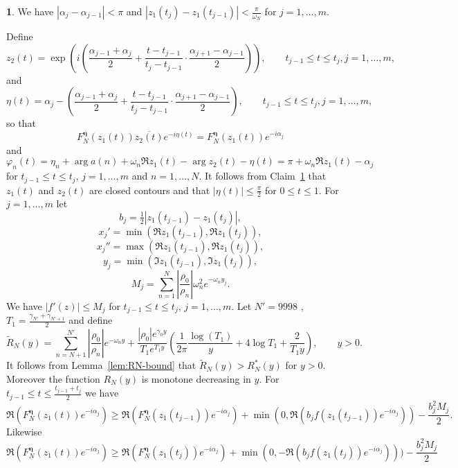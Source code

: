 \documentclass[oneside,english]{amsart}
\numberwithin{equation}{section}
\numberwithin{figure}{section}
\theoremstyle{plain}
\theoremstyle{plain}
\theoremstyle{plain}
\theoremstyle{definition}
\newtheorem{claim}{\protect\claimname}
\providecommand{\claimname}{Claim}
\begin{document}
\begin{claim}
\label{claim:arguments}We have $\left|\alpha_{j}-\alpha_{j-1}\right|<\pi$
and $\left|z_{1}(t_{j})-z_{1}(t_{j-1})\right|<\frac{\pi}{\omega_{N}}$
for $j=1,\dotsc,m$.
\end{claim}
Define 
\[
z_{2}(t)=\exp\left(i\left(\frac{\alpha_{j-1}+\alpha_{j}}{2}+\frac{t-t_{j-1}}{t_{j}-t_{j-1}}\cdot\frac{\alpha_{j+1}-\alpha_{j-1}}{2}\right)\right),\qquad t_{j-1}\leq t\leq t_{j},j=1,\dotsc,m,
\]
and
\[
\eta(t)=\alpha_{j}-\left(\frac{\alpha_{j-1}+\alpha_{j}}{2}+\frac{t-t_{j-1}}{t_{j}-t_{j-1}}\cdot\frac{\alpha_{j+1}-\alpha_{j-1}}{2}\right),\qquad t_{j-1}\leq t\leq t_{j},j=1,\dotsc,m,
\]
so that
\[
F_{N}^{\boldsymbol{\eta}}(z_{1}(t))\overline{z_{2}(t)}e^{-i\eta(t)}=F_{N}^{\boldsymbol{\eta}}(z_{1}(t))e^{-i\alpha_{j}}
\]
and
\[
\varphi_{n}(t)=\eta_{n}+\arg a(n)+\omega_{n}\Re z_{1}(t)-\arg z_{2}(t)-\eta(t)=\pi+\omega_{n}\Re z_{1}(t)-\alpha_{j}
\]
for $t_{j-1}\leq t\leq t_{j}$, $j=1,\dotsc,m$ and $n=1,\dotsc,N$.
It follows from Claim~\ref{claim:arguments} that $z_{1}(t)$ and
$z_{2}(t)$ are closed contours and that $\left|\eta(t)\right|\leq\frac{\pi}{2}$
for $0\leq t\leq1$. For $j=1,\dotsc,m$ let 
\[
b_{j}=\tfrac{1}{2}\left|z_{1}(t_{j-1})-z_{1}(t_{j})\right|,
\]
\[
x_{j}'=\min(\Re z_{1}(t_{j-1}),\Re z_{1}(t_{j})),
\]
\[
x_{j}''=\max(\Re z_{1}(t_{j-1}),\Re z_{1}(t_{j})),
\]
\[
y_{j}=\min(\Im z_{1}(t_{j-1}),\Im z_{1}(t_{j})),
\]
\[
M_{j}=\sum_{n=1}^{N}\left|\frac{\rho_{0}}{\rho_{n}}\right|\omega_{n}^{2}e^{-\omega_{n}y_{j}}.
\]
We have $\left|f'(z)\right|\leq M_{j}$ for $t_{j-1}\leq t\leq t_{j}$,
$j=1,\dotsc,m$. Let $N'=9998$ , $T_{1}=\frac{\gamma_{N'}+\gamma_{N'+1}}{2}$
and define
\[
\widetilde{R}_{N}(y)=\sum_{n=N+1}^{N'}\left|\frac{\rho_{0}}{\rho_{n}}\right|e^{-\omega_{n}y}+\frac{\left|\rho_{0}\right|e^{\gamma_{0}y}}{T_{1}e^{T_{1}y}}\left(\frac{1}{2\pi}\frac{\log\left(T_{1}\right)}{y}+4\log T_{1}+\frac{2}{T_{1}y}\right),\qquad y>0.
\]
It follows from Lemma~\ref{lem:RN-bound} that $\widetilde{R}_{N}(y)>R_{N}^{*}(y)$
for $y>0$. Moreover the function $R_{N}(y)$ is monotone decreasing
in $y$. For $t_{j-1}\leq t\leq\frac{t_{j-1}+t_{j}}{2}$ we have
\[
\Re\left(F_{N}^{\boldsymbol{\eta}}(z_{1}(t))e^{-i\alpha_{j}}\right)\geq\Re\left(F_{N}^{\boldsymbol{\eta}}(z_{1}(t_{j-1}))e^{-i\alpha_{j}}\right)+\min\left(0,\Re\left(b_{j}f(z_{1}(t_{j-1}))e^{-i\alpha_{j}}\right)\right)-\frac{b_{j}^{2}M_{j}}{2}.
\]
Likewise
\[
\Re\left(F_{N}^{\boldsymbol{\eta}}(z_{1}(t))e^{-i\alpha_{j}}\right)\geq\Re\left(F_{N}^{\boldsymbol{\eta}}(z_{1}(t_{j}))e^{-i\alpha_{j}}\right)+\min\left(0,-\Re\left(b_{j}f(z_{1}(t_{j}))e^{-i\alpha_{j}}\right)\right)\Bigr)-\frac{b_{j}^{2}M_{j}}{2}
\]
\end{document}
